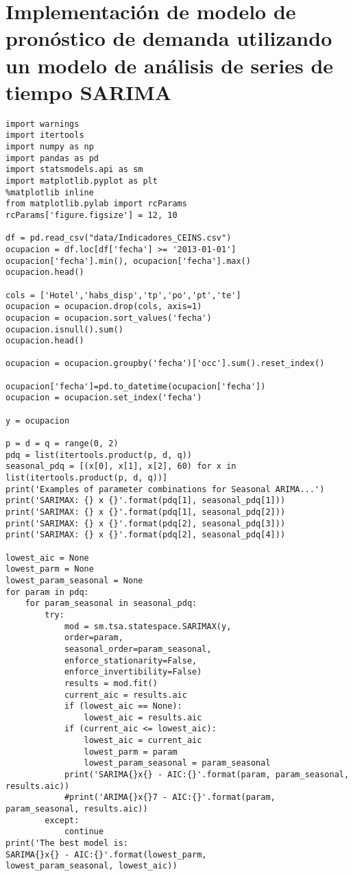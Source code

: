\chapter{Implementación de modelo de pronóstico de demanda utilizando un modelo de análisis de series de tiempo SARIMA}
\label{ch:anexoa¡c}

\begin{verbatim}
import warnings
import itertools
import numpy as np
import pandas as pd
import statsmodels.api as sm
import matplotlib.pyplot as plt
%matplotlib inline
from matplotlib.pylab import rcParams
rcParams['figure.figsize'] = 12, 10

df = pd.read_csv("data/Indicadores_CEINS.csv")
ocupacion = df.loc[df['fecha'] >= '2013-01-01']
ocupacion['fecha'].min(), ocupacion['fecha'].max()
ocupacion.head()

cols = ['Hotel','habs_disp','tp','po','pt','te']
ocupacion = ocupacion.drop(cols, axis=1)
ocupacion = ocupacion.sort_values('fecha')
ocupacion.isnull().sum()
ocupacion.head()

ocupacion = ocupacion.groupby('fecha')['occ'].sum().reset_index()

ocupacion['fecha']=pd.to_datetime(ocupacion['fecha'])
ocupacion = ocupacion.set_index('fecha')

y = ocupacion

p = d = q = range(0, 2)
pdq = list(itertools.product(p, d, q))
seasonal_pdq = [(x[0], x[1], x[2], 60) for x in list(itertools.product(p, d, q))]
print('Examples of parameter combinations for Seasonal ARIMA...')
print('SARIMAX: {} x {}'.format(pdq[1], seasonal_pdq[1]))
print('SARIMAX: {} x {}'.format(pdq[1], seasonal_pdq[2]))
print('SARIMAX: {} x {}'.format(pdq[2], seasonal_pdq[3]))
print('SARIMAX: {} x {}'.format(pdq[2], seasonal_pdq[4]))

lowest_aic = None
lowest_parm = None
lowest_param_seasonal = None
for param in pdq:
    for param_seasonal in seasonal_pdq:
        try:
            mod = sm.tsa.statespace.SARIMAX(y,
            order=param,
            seasonal_order=param_seasonal,
            enforce_stationarity=False,
            enforce_invertibility=False)
            results = mod.fit()
            current_aic = results.aic
            if (lowest_aic == None):
                lowest_aic = results.aic
            if (current_aic <= lowest_aic):
                lowest_aic = current_aic
                lowest_parm = param
                lowest_param_seasonal = param_seasonal
            print('SARIMA{}x{} - AIC:{}'.format(param, param_seasonal, results.aic))
            #print('ARIMA{}x{}7 - AIC:{}'.format(param, param_seasonal, results.aic))
        except:
            continue
print('The best model is: 
SARIMA{}x{} - AIC:{}'.format(lowest_parm, 
lowest_param_seasonal, lowest_aic))
            


\end{verbatim}
